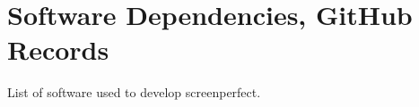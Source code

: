 
\chapter{Software Dependencies, GitHub Records} %

\label{AppendixD} %


List of software used to develop screenperfect.



